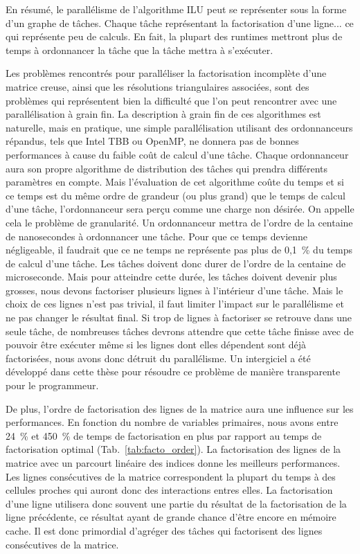 En résumé, le parallélisme de l'algorithme ILU peut se représenter sous la forme d'un graphe de tâches.
%
Chaque tâche représentant la factorisation d'une ligne... ce qui représente peu de calculs.
%
En fait, la plupart des runtimes mettront plus de temps à ordonnancer la tâche que la tâche mettra à s'exécuter.


Les problèmes rencontrés pour paralléliser la factorisation incomplète d'une matrice creuse, ainsi que les résolutions triangulaires associées, sont des problèmes qui représentent bien la difficulté que l'on peut rencontrer avec une parallélisation à grain fin.
%
La description à grain fin de ces algorithmes est naturelle, mais en pratique, une simple parallélisation utilisant des ordonnanceurs répandus, tels que Intel TBB ou OpenMP, ne donnera pas de bonnes performances à cause du faible coût de calcul d'une tâche.
%
Chaque ordonnanceur aura son propre algorithme de distribution des tâches qui prendra différents paramètres en compte.
%
Mais l'évaluation de cet algorithme coûte du temps et si ce temps est du même ordre de grandeur (ou plus grand) que le temps de calcul d'une tâche, l'ordonnanceur sera perçu comme une charge non désirée.
%
On appelle cela le problème de granularité.
%
Un ordonnanceur mettra de l'ordre de la centaine de nanosecondes à ordonnancer une tâche.
%
Pour que ce temps devienne négligeable, il faudrait que ce ne temps ne représente pas plus de 0,1~\% du temps de calcul d'une tâche.
%
Les tâches doivent donc durer de l'ordre de la centaine de microseconde.
%
Mais pour atteindre cette durée, les tâches doivent devenir plus grosses, nous devons factoriser plusieurs lignes à l'intérieur d'une tâche.
%
Mais le choix de ces lignes n'est pas trivial, il faut limiter l'impact sur le parallélisme et ne pas changer le résultat final.
%
Si trop de lignes à factoriser se retrouve dans une seule tâche, de nombreuses tâches devrons attendre que cette tâche finisse avec de pouvoir être exécuter même si les lignes dont elles dépendent sont déjà factorisées, nous avons donc détruit du parallélisme.
%
Un intergiciel a été développé dans cette thèse pour résoudre ce problème de manière transparente pour le programmeur.



De plus, l'ordre de factorisation des lignes de la matrice aura une influence sur les performances.
%
En fonction du nombre de variables primaires, nous avons entre 24~\% et 450~\% de temps de factorisation en plus par rapport au temps de factorisation optimal (Tab.~\ref{tab:facto_order}).
%
La factorisation des lignes de la matrice avec un parcourt linéaire des indices donne les meilleurs performances.
%
Les lignes consécutives de la matrice correspondent la plupart du temps à des cellules proches qui auront donc des interactions entres elles.
%
La factorisation d'une ligne utilisera donc souvent une partie du résultat de la factorisation de la ligne précédente, ce résultat ayant de grande chance d'être encore en mémoire cache.
%
Il est donc primordial d'agréger des tâches qui factorisent des lignes consécutives de la matrice.


